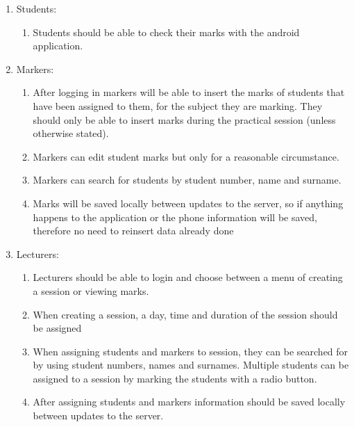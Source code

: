 \documentclass{article}
\begin{document}
\begin{enumerate}
\item  Students:  

\begin{enumerate}
\item  Students should be able to check their marks with the android application. 
\end{enumerate}

\item  Markers: 

\begin{enumerate}
\item  After logging in markers will be able to insert the marks of students that have been assigned to them, for the subject they are marking. They should only be able to insert marks during the practical session (unless otherwise stated).

\item  Markers can edit student marks but only for a reasonable circumstance.

\item  Markers can search for students by student number, name and surname.

\item  Marks will be saved locally between updates to the server, so if anything happens to the application or the phone information will be saved, therefore no need to reinsert data already done 
\end{enumerate}

\item  Lecturers:

\begin{enumerate}
\item  Lecturers should be able to login and choose between a menu of creating a session or viewing marks.

\item  When creating a session, a day, time and duration of the session should be assigned

\item  When assigning students and markers to session, they can be searched for by using student numbers, names and surnames. Multiple students can be assigned to a session by marking the students with a radio button.

\item  After assigning students and markers information should be saved locally between updates to the server. 
\end{enumerate}
\end{enumerate}
\end{document}
